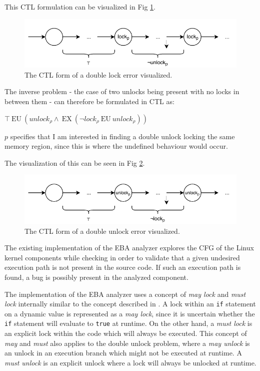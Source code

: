 \newpar This CTL formulation can be visualized in Fig \ref{fig:doublelock}.

\begin{figure}[h]
    \centering
    \includegraphics{background/figures/doublelock}
    \caption{The CTL form of a double lock error visualized.}
    \label{fig:doublelock}
\end{figure}

\newpar The inverse problem - the case of two unlocks being present with no locks in between them - can therefore be formulated in CTL as: 

\begin{center}
    $\top\:\mathrm{EU}\:\left({u n l o c k}_{\rho} \wedge\:\mathrm{EX}\:\left(\neg {l o c k}_{\rho}\:\mathrm{EU}\:{u n l o c k}_{\rho}\right)\right)$
\end{center}

\newpar $p$ specifies that I am interested in finding a double unlock locking the same memory region, since this is where the undefined behaviour would occur.

\newpar The visualization of this can be seen in Fig \ref{fig:doubleunlock}.

\begin{figure}[h]
    \centering
    \includegraphics{background/figures/doubleunlock}
    \caption{The CTL form of a double unlock error visualized.}
    \label{fig:doubleunlock}
\end{figure}

\newpar The existing implementation of the EBA analyzer explores the CFG of the Linux kernel components while checking in order to validate that a given undesired execution path is not present in the source code. If such an execution path is found, a bug is possibly present in the analyzed component.

\newpar The implementation of the EBA analyzer uses a concept of \textit{may lock} and \textit{must lock} internally similar to the concept described in \cite{Godefroid}. A lock within an \texttt{if} statement on a dynamic value is represented as a \textit{may lock}, since it is uncertain whether the \texttt{if} statement will evaluate to \texttt{true} at runtime. On the other hand, a \textit{must lock} is an explicit lock within the code which will always be executed. This concept of \textit{may} and \textit{must} also applies to the double unlock problem, where a \textit{may unlock} is an unlock in an execution branch which might not be executed at runtime. A \textit{must unlock} is an explicit unlock where a lock will always be unlocked at runtime.

